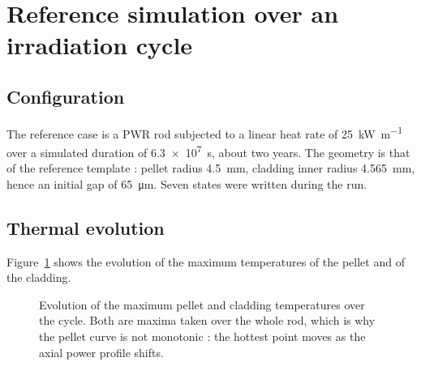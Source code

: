 \documentclass[12pt,a4paper]{report}
\begin{document}
\section{Reference simulation over an irradiation cycle}

\subsection{Configuration}

The reference case is a PWR rod subjected to a linear heat rate of
\SI{25}{\kilo\watt\per\metre} over a simulated duration of \SI{6.3e7}{\second},
about two years. The geometry is that of the reference template : pellet radius
\SI{4.5}{\milli\metre}, cladding inner radius \SI{4.565}{\milli\metre}, hence an
initial gap of \SI{65}{\micro\metre}. Seven states were written during the run.

\subsection{Thermal evolution}

Figure~\ref{fig:temp} shows the evolution of the maximum temperatures of the
pellet and of the cladding.

\begin{figure}[htbp]
\centering
{}
\caption[Pellet and cladding temperatures over the cycle]{Evolution of the
maximum pellet and cladding temperatures over the cycle. Both are maxima taken
over the whole rod, which is why the pellet curve is not monotonic : the
hottest point moves as the axial power profile shifts.}
\label{fig:temp}
\end{figure}
\end{document}
